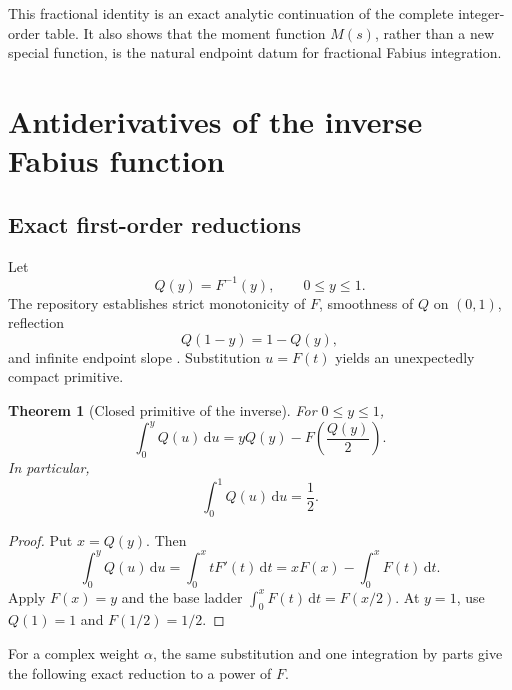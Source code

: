 \documentclass[11pt,oneside]{article}
\newtheorem{theorem}{Theorem}[section]
\theoremstyle{definition}
\theoremstyle{remark}
\newcommand{\dd}{\,\mathrm d}
\newcommand{\1}{\mathbf 1}
\begin{document}
This fractional identity is an exact analytic continuation of the complete
integer-order table.  It also shows that the moment function \(M(s)\), rather
than a new special function, is the natural endpoint datum for fractional
Fabius integration.

\section{Antiderivatives of the inverse Fabius function}

\subsection{Exact first-order reductions}
Let
\begin{equation}
 Q(y)=F^{-1}(y),\qquad 0\leq y\leq1.                            \label{eq:Q-def}
\end{equation}
The repository establishes strict monotonicity of \(F\), smoothness of \(Q\)
on \((0,1)\), reflection
\begin{equation}
 Q(1-y)=1-Q(y),                                                \label{eq:Q-reflect}
\end{equation}
and infinite endpoint slope
\cite{ProveItPrimary,ProveItFrontiers}.  Substitution \(u=F(t)\) yields an
unexpectedly compact primitive.

\begin{theorem}[Closed primitive of the inverse]\label{thm:inverse-first}
For \(0\leq y\leq1\),
\begin{equation}
 \boxed{\quad
 \int_0^yQ(u)\dd u
 =yQ(y)-F\!\left(\frac{Q(y)}2\right).
 \quad}                                                        \label{eq:inverse-first}
\end{equation}
In particular,
\begin{equation}
 \int_0^1Q(u)\dd u=\frac12.                                   \label{eq:inverse-mean}
\end{equation}
\end{theorem}

\begin{proof}
Put \(x=Q(y)\).  Then
\[
 \int_0^yQ(u)\dd u=\int_0^xtF'(t)\dd t
 =xF(x)-\int_0^xF(t)\dd t.
\]
Apply \(F(x)=y\) and the base ladder
\(\int_0^xF(t)\dd t=F(x/2)\).  At \(y=1\), use
\(Q(1)=1\) and \(F(1/2)=1/2\).
\end{proof}

For a complex weight \(\alpha\), the same substitution and one integration by
parts give the following exact reduction to a power of \(F\).
\end{document}

